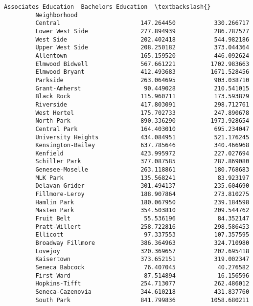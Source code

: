 \documentclass[11pt]{article}
\begin{document}
\begin{Verbatim}[commandchars=\\\{\}]
                             Associates Education  Bachelors Education  \textbackslash{}
         Neighborhood                                                    
         Central                       147.264450           330.266717   
         Lower West Side               277.894939           286.787577   
         West Side                     202.402418           544.982186   
         Upper West Side               208.250182           373.044364   
         Allentown                     165.159520           446.092624   
         Elmwood Bidwell               567.661221          1702.983663   
         Elmwood Bryant                412.493683          1671.528456   
         Parkside                      263.064695           903.038710   
         Grant-Amherst                  90.449028           210.541015   
         Black Rock                    115.960711           173.593879   
         Riverside                     417.803091           298.712761   
         West Hertel                   175.702733           247.890678   
         North Park                    890.336290          1973.928654   
         Central Park                  164.403010           695.234047   
         University Heights            434.084951           521.176245   
         Kensington-Bailey             637.785646           340.466968   
         Kenfield                      423.995972           227.027694   
         Schiller Park                 377.087585           287.869080   
         Genesee-Moselle               263.118861           180.768683   
         MLK Park                      135.568241            83.923197   
         Delavan Grider                301.494137           235.604690   
         Fillmore-Leroy                188.907864           273.810275   
         Hamlin Park                   180.067950           239.184598   
         Masten Park                   354.503810           209.544762   
         Fruit Belt                     55.536196            84.352147   
         Pratt-Willert                 258.722816           298.586453   
         Ellicott                       97.337553           107.357595   
         Broadway Fillmore             386.364963           324.710980   
         Lovejoy                       320.369657           202.695418   
         Kaisertown                    373.652151           319.002347   
         Seneca Babcock                 76.407045            40.276582   
         First Ward                     87.514894            16.156596   
         Hopkins-Tifft                 254.713077           262.486012   
         Seneca-Cazenovia              344.610218           431.837760   
         South Park                    841.799836          1058.680211   
         

\end{Verbatim}
\end{document}
